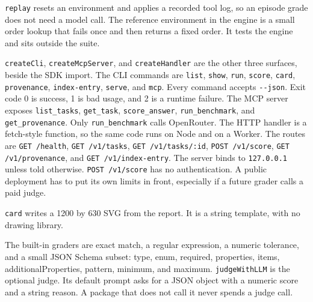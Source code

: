 \texttt{replay} resets an environment and applies a recorded tool log, so an episode grade does not need a model call. The reference environment in the engine is a small order lookup that fails once and then returns a fixed order. It tests the engine and sits outside the suite.

\texttt{createCli}, \texttt{createMcpServer}, and \texttt{createHandler} are the other three surfaces, beside the SDK import. The CLI commands are \texttt{list}, \texttt{show}, \texttt{run}, \texttt{score}, \texttt{card}, \texttt{provenance}, \texttt{index-entry}, \texttt{serve}, and \texttt{mcp}. Every command accepts \texttt{-{}-json}. Exit code 0 is success, 1 is bad usage, and 2 is a runtime failure. The MCP server exposes \texttt{list\_tasks}, \texttt{get\_task}, \texttt{score\_answer}, \texttt{run\_benchmark}, and \texttt{get\_provenance}. Only \texttt{run\_benchmark} calls OpenRouter. The HTTP handler is a fetch-style function, so the same code runs on Node and on a Worker. The routes are \texttt{GET /health}, \texttt{GET /v1/tasks}, \texttt{GET /v1/tasks/:id}, \texttt{POST /v1/score}, \texttt{GET /v1/provenance}, and \texttt{GET /v1/index-entry}. The server binds to \texttt{127.0.0.1} unless told otherwise. \texttt{POST /v1/score} has no authentication. A public deployment has to put its own limits in front, especially if a future grader calls a paid judge.

\texttt{card} writes a 1200 by 630 SVG from the report. It is a string template, with no drawing library.

The built-in graders are exact match, a regular expression, a numeric tolerance, and a small JSON Schema subset: type, enum, required, properties, items, additionalProperties, pattern, minimum, and maximum. \texttt{judgeWithLLM} is the optional judge. Its default prompt asks for a JSON object with a numeric score and a string reason. A package that does not call it never spends a judge call.
